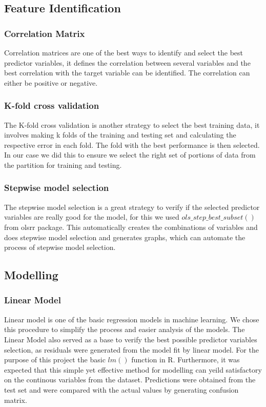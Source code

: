 \documentclass[11pt]{article}
\begin{document}
\begin{multicols}{2}
    \subsection{Feature Identification}
    \subsubsection{Correlation Matrix}
    Correlation matrices are one of the best ways to identify and select the best predictor variables, it defines the correlation between several variables and the best correlation with the target variable can be identified. The correlation can either be positive or negative.
    \subsubsection{K-fold cross validation }
    The K-fold cross validation is another strategy to select the best training data, it involves making k folds of the training and testing set and calculating the respective error in each fold. The fold with the best performance is then selected. In our case we did this to ensure we select the right set of portions of data from the partition for training and testing.
    \subsubsection{Stepwise model selection}
    The stepwise model selection is a great strategy to verify if the selected predictor variables are really good for the model, for this we used $ols\_step\_best\_subset()$ from olsrr \cite{ols} package. This automatically creates the combinations of variables and does stepwise model selection and generates graphs, which can automate the process of stepwise model selection.

    \subsection{Modelling}
    \subsubsection{Linear Model}
    Linear model is one of the basic regression models in machine learning. We chose this procedure to simplify the process and easier analysis of the models. The Linear Model also served as a base to verify the best possible predictor variables selection, as residuals were generated from the model fit by linear model. For the purpose of this project the basic $lm()$ function in R. Furthermore,  it was expected that this simple yet effective method for modelling can yeild satisfactory  on the continous variables from the dataset. Predictions were obtained from the test set and were compared with the actual values by generating confusion matrix.


\end{multicols}
\end{document}
